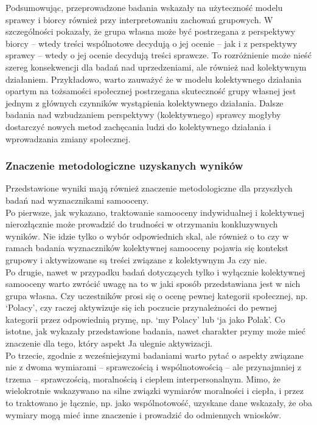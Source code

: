 \documentclass[man]{apa6}
\begin{document}
Podsumowując, przeprowadzone badania wskazały na użyteczność modelu sprawcy i biorcy również przy interpretowaniu zachowań grupowych. W szczególności pokazały, że grupa własna może być postrzegana z perspektywy biorcy -- wtedy treści wspólnotowe decydują o jej ocenie -- jak i z perspektywy sprawcy -- wtedy o jej ocenie decydują treści sprawcze. To rozróżnienie może nieść szereg konsekwencji dla badań nad uprzedzeniami, ale również nad kolektywnym działaniem. Przykładowo, warto zauważyć że w modelu kolektywnego działania opartym na tożsamości społecznej \parencite{van2008toward} postrzegana skuteczność grupy własnej jest jednym z głównych czynników wystąpienia kolektywnego działania. Dalsze badania nad wzbudzaniem perspektywy (kolektywnego) sprawcy mogłyby dostarczyć nowych metod zachęcania ludzi do kolektywnego działania i wprowadzania zmiany społecznej.\\

\subsubsection{Znaczenie metodologiczne uzyskanych wyników}

Przedstawione wyniki mają również znaczenie metodologiczne dla przyszłych badań nad wyznacznikami samooceny.\\

Po pierwsze, jak wykazano, traktowanie samooceny indywidualnej i kolektywnej nierozłącznie może prowadzić do trudności w otrzymaniu konkluzywnych wyników. Nie idzie tylko o wybór odpowiednich skal, ale również o to czy w ramach badania wyznaczników kolektywnej samooceny pojawia się kontekst grupowy i aktywizowane są treści związane z kolektywnym Ja czy nie. \\

Po drugie, nawet w przypadku badań dotyczących tylko i wyłącznie kolektywnej samooceny warto zwrócić uwagę na to w jaki sposób przedstawiana jest w nich grupa własna. Czy uczestników prosi się o ocenę pewnej kategorii społecznej, np. `Polacy', czy raczej aktywizuje się ich poczucie przynależności do pewnej kategorii przez odpowiednią prymę, np. `my Polacy' lub `ja jako Polak'. Co istotne, jak wykazały przedstawione badania, nawet charakter prymy może mieć znaczenie dla tego, który aspekt Ja ulegnie aktywizacji. \\

Po trzecie, zgodnie z wcześniejszymi badaniami \parencite[np.,][]{leach2007group} warto pytać o aspekty związane nie z dwoma wymiarami -- sprawczością i wspólnotowością -- ale przynajmniej z trzema -- sprawczością, moralnością i ciepłem interpersonalnym. Mimo, że wielokrotnie wskazywano na silne związki wymiarów moralności i ciepła, i przez to traktowano je łącznie, np. jako wspólnotowość, uzyskane dane wskazały, że oba wymiary mogą mieć inne znaczenie i prowadzić do odmiennych wniosków.
\end{document}

